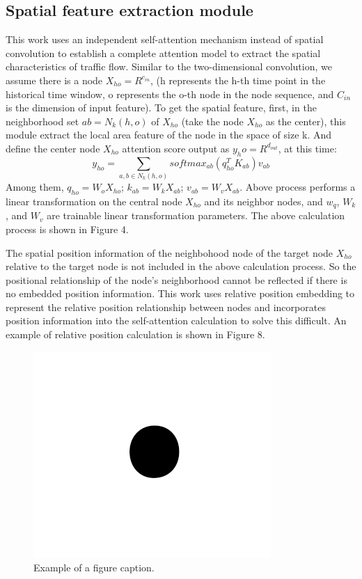 \documentclass[conference]{IEEEtran}
\begin{document}
\subsection{Spatial feature extraction module}
This work uses an independent self-attention mechanism instead of spatial convolution to establish a complete attention model to extract the spatial characteristics of traffic flow. Similar to the two-dimensional convolution, we  assume there is a node $X_{ho} = R^{c_{in}}$, (h represents the h-th time point in the historical time window, o represents the o-th node in the node sequence, and $C_{in}$ is the dimension of input feature). To get the spatial feature, first, in the neighborhood set $ab = N_k(h,o)$ of $X_{ho}$ (take the node $X_{ho}$ as the center), this module extract the local area feature of the node in the space of size k. And define the center node $X_{ho}$ attention score output as $y_ho=R^{d_{out}}$, at this time:
\begin{equation}
    y_{ho} = \sum_{a,b \in N_k(h,o)} softmax_{ab}(q_{ho}^TK_{ab})v_{ab}
\end{equation}
Among them, $q_{ho}=W_oX_{ho}$; $k_{ab} = W_kX_{ab}$; $v_{ab}=W_vX_{ab}$. Above process performs a linear transformation on the central node $X_{ho}$ and its neighbor nodes, and $w_q$, $W_k$, and $W_v$ are trainable linear transformation parameters. The above calculation process is shown in Figure 4.
\par
The spatial position information of the neighbohood node of the target node $X_{ho}$ relative to the target node is not included in the above calculation process. So the positional relationship of the node's neighborhood cannot be reflected if there is no embedded position information. This work uses relative position embedding to represent the relative position relationship between nodes and incorporates position information into the self-attention calculation to solve this difficult. An example of relative position calculation is shown in Figure 8.
\begin{figure}[htbp]
    \centerline{\includegraphics{fig1.png}}
    \caption{Example of a figure caption.}
    \label{fig}
\end{figure}
\end{document}
